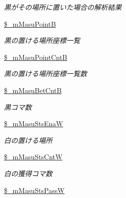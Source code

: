 \begin{DoxyCompactItemize}
\begin{DoxyCompactList}\small\item\em 黒がその場所に置いた場合の解析結果 \end{DoxyCompactList}\item 
\hyperlink{class_reversi_a015fefbe17d9d4f13946cecb89493e37}{\$\+\_\+m\+Masu\+PointB}\hypertarget{class_reversi_a015fefbe17d9d4f13946cecb89493e37}{}\label{class_reversi_a015fefbe17d9d4f13946cecb89493e37}

\begin{DoxyCompactList}\small\item\em 黒の置ける場所座標一覧 \end{DoxyCompactList}\item 
\hyperlink{class_reversi_af8936304d7c1ccb26eb7343172e11987}{\$\+\_\+m\+Masu\+Point\+CntB}\hypertarget{class_reversi_af8936304d7c1ccb26eb7343172e11987}{}\label{class_reversi_af8936304d7c1ccb26eb7343172e11987}

\begin{DoxyCompactList}\small\item\em 黒の置ける場所座標一覧数 \end{DoxyCompactList}\item 
\hyperlink{class_reversi_abf0e4db44b6b0ae1ecec4827e2394cdd}{\$\+\_\+m\+Masu\+Bet\+CntB}\hypertarget{class_reversi_abf0e4db44b6b0ae1ecec4827e2394cdd}{}\label{class_reversi_abf0e4db44b6b0ae1ecec4827e2394cdd}

\begin{DoxyCompactList}\small\item\em 黒コマ数 \end{DoxyCompactList}\item 
\hyperlink{class_reversi_a1cf814c44538183769e091e84e4c810b}{\$\+\_\+m\+Masu\+Sts\+EnaW}\hypertarget{class_reversi_a1cf814c44538183769e091e84e4c810b}{}\label{class_reversi_a1cf814c44538183769e091e84e4c810b}

\begin{DoxyCompactList}\small\item\em 白の置ける場所 \end{DoxyCompactList}\item 
\hyperlink{class_reversi_a14d7803befeac5ddaf9bedbac66e0812}{\$\+\_\+m\+Masu\+Sts\+CntW}\hypertarget{class_reversi_a14d7803befeac5ddaf9bedbac66e0812}{}\label{class_reversi_a14d7803befeac5ddaf9bedbac66e0812}

\begin{DoxyCompactList}\small\item\em 白の獲得コマ数 \end{DoxyCompactList}\item 
\hyperlink{class_reversi_a3a60b04cc5f54e1196feffc0ec12d89a}{\$\+\_\+m\+Masu\+Sts\+PassW}\hypertarget{class_reversi_a3a60b04cc5f54e1196feffc0ec12d89a}{}\label{class_reversi_a3a60b04cc5f54e1196feffc0ec12d89a}


\end{DoxyCompactItemize}

